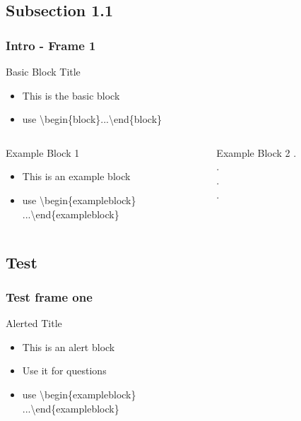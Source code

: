\documentclass[10pt,compress]{beamer}
\begin{document}
\subsection{Subsection 1.1}
\begin{frame}\frametitle{Intro - Frame 1} 
\begin{block}{Basic Block Title}
\begin{itemize}
 \item This is the basic block
\item use \textbackslash begin\{block\}...\textbackslash end\{block\}
\end{itemize}
\end{block}
\pause
\begin{columns}
\begin{column}{5cm}
\begin{exampleblock}{Example Block 1}
\begin{itemize}
 \item This is an example block
\item use \textbackslash begin\{exampleblock\}\\ ...\textbackslash end\{exampleblock\}
\end{itemize}
\end{exampleblock}
\pause
\end{column}
\begin{column}{5cm}
\begin{exampleblock}{Example Block 2}
.\\
.\\
.\\
.\\
\end{exampleblock}
\end{column}
\end{columns}
\end{frame}

\subsection{Test}
\begin{frame}\frametitle{Test frame one}
\begin{alertblock}{Alerted Title}
\begin{itemize}
 \item This is an alert block
 \item Use it for questions
\item use \textbackslash begin\{exampleblock\}\\ ...\textbackslash end\{exampleblock\}
\end{itemize}
\end{alertblock}
\end{frame}
\end{document}
